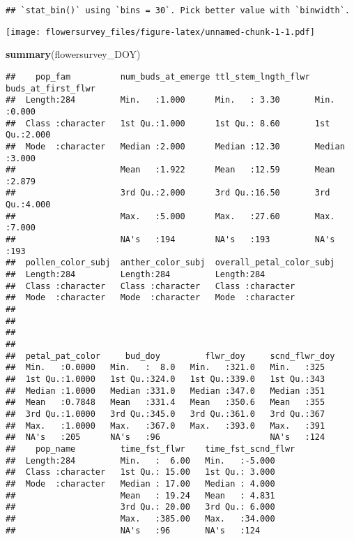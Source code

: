 \documentclass[
]{article}
\newenvironment{Shaded}{\begin{snugshade}}{\end{snugshade}}
\newcommand{\FunctionTok}[1]{\textcolor[rgb]{0.13,0.29,0.53}{\textbf{#1}}}
\newcommand{\NormalTok}[1]{#1}
\begin{document}
\begin{verbatim}
## `stat_bin()` using `bins = 30`. Pick better value with `binwidth`.
\end{verbatim}

\texttt{[image: flowersurvey\_files/figure-latex/unnamed-chunk-1-1.pdf]}

\begin{Shaded}
\begin{Highlighting}[]
\FunctionTok{summary}\NormalTok{(flowersurvey\_DOY)}
\end{Highlighting}
\end{Shaded}

\begin{verbatim}
##    pop_fam          num_buds_at_emerge ttl_stem_lngth_flwr buds_at_first_flwr
##  Length:284         Min.   :1.000      Min.   : 3.30       Min.   :0.000     
##  Class :character   1st Qu.:1.000      1st Qu.: 8.60       1st Qu.:2.000     
##  Mode  :character   Median :2.000      Median :12.30       Median :3.000     
##                     Mean   :1.922      Mean   :12.59       Mean   :2.879     
##                     3rd Qu.:2.000      3rd Qu.:16.50       3rd Qu.:4.000     
##                     Max.   :5.000      Max.   :27.60       Max.   :7.000     
##                     NA's   :194        NA's   :193         NA's   :193       
##  pollen_color_subj  anther_color_subj  overall_petal_color_subj
##  Length:284         Length:284         Length:284              
##  Class :character   Class :character   Class :character        
##  Mode  :character   Mode  :character   Mode  :character        
##                                                                
##                                                                
##                                                                
##                                                                
##  petal_pat_color     bud_doy         flwr_doy     scnd_flwr_doy
##  Min.   :0.0000   Min.   :  8.0   Min.   :321.0   Min.   :325  
##  1st Qu.:1.0000   1st Qu.:324.0   1st Qu.:339.0   1st Qu.:343  
##  Median :1.0000   Median :331.0   Median :347.0   Median :351  
##  Mean   :0.7848   Mean   :331.4   Mean   :350.6   Mean   :355  
##  3rd Qu.:1.0000   3rd Qu.:345.0   3rd Qu.:361.0   3rd Qu.:367  
##  Max.   :1.0000   Max.   :367.0   Max.   :393.0   Max.   :391  
##  NA's   :205      NA's   :96                      NA's   :124  
##    pop_name         time_fst_flwr    time_fst_scnd_flwr
##  Length:284         Min.   :  6.00   Min.   :-5.000    
##  Class :character   1st Qu.: 15.00   1st Qu.: 3.000    
##  Mode  :character   Median : 17.00   Median : 4.000    
##                     Mean   : 19.24   Mean   : 4.831    
##                     3rd Qu.: 20.00   3rd Qu.: 6.000    
##                     Max.   :385.00   Max.   :34.000    
##                     NA's   :96       NA's   :124
\end{verbatim}
\end{document}

